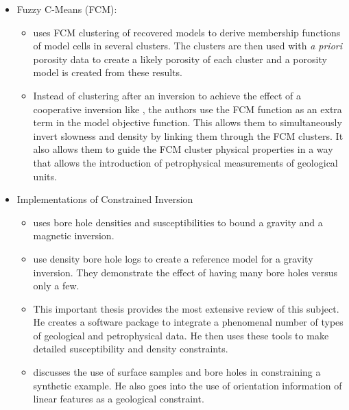 \begin{itemize}
\item Fuzzy C-Means (FCM): 
\begin{itemize}
	\item \cite{paasche2006integration} uses FCM clustering of recovered models to derive membership functions of model cells in several clusters. The clusters are then used with \emph{a priori} porosity data to create a likely porosity of each cluster and a porosity model is created from these results.
	\item \cite{sun2015multidomain} Instead of clustering after an inversion to achieve the effect of a cooperative inversion like \cite{paasche2006integration}, the authors use the FCM function as an extra term in the model objective function. This allows them to simultaneously invert slowness and density by linking them through the FCM clusters. It also allows them to guide the FCM cluster physical properties in a way that allows the introduction of petrophysical measurements of geological units.
\end{itemize}
\item Implementations of Constrained Inversion
\begin{itemize}
	\item \cite{phillips2001thesis} uses bore hole densities and susceptibilities to bound a gravity and a magnetic inversion.
	\item \cite{farquharson2008geologically} use density bore hole logs to create a reference model for a gravity inversion. They demonstrate  the effect of having many bore holes versus only a few.
	\item \cite{williams2008geologically} This important thesis provides the most extensive review of this subject. He creates a software package to integrate a phenomenal number of types of geological and petrophysical data. He then uses these tools to make detailed susceptibility and density constraints.
	\item \cite{Lelievre2009Integrating} discusses the use of surface samples and bore holes in constraining a synthetic example. He also goes into the use of orientation information of linear features as a geological constraint.
	
	

\end{itemize}
\end{itemize}





\endinput

 Interestingly, the assumption that all magnetizations are in the same direction also assumes that all Koenigsberger ratios are equal.

Any text after an \endinput is ignored.
You could put scraps here or things in progress.
